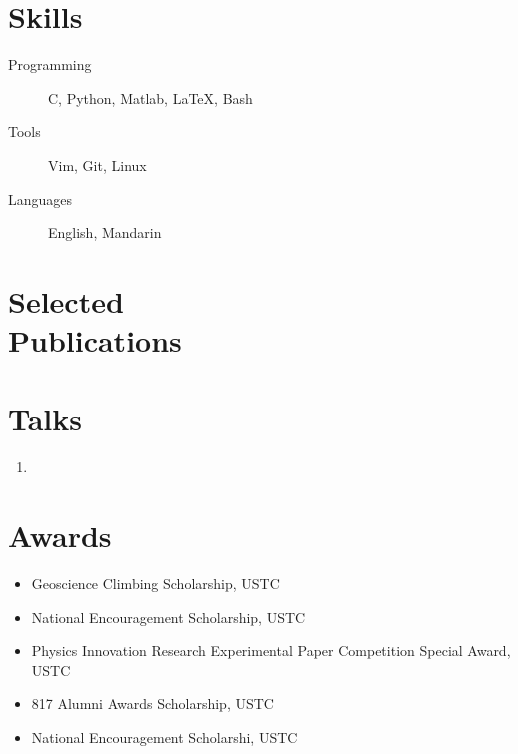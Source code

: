 \documentclass{mycv}
\begin{document}
\section{Skills}

\begin{description}
  \item[Programming] C, Python,  Matlab, \LaTeX, Bash
  \item[Tools] Vim, Git, Linux
  \item[Languages] English, Mandarin
\end{description}

\section{Selected \\ Publications}%

\section{Talks}

\begin{enumerate}
  \item
\end{enumerate}

\section{Awards}

\begin{itemize}
  \item Geoscience Climbing Scholarship, USTC 
  \item National Encouragement Scholarship, USTC 
  \item Physics Innovation Research Experimental Paper Competition Special Award, USTC 
  \item 817 Alumni Awards Scholarship, USTC 
  \item National Encouragement Scholarshi, USTC 
\end{itemize}
\end{document}
